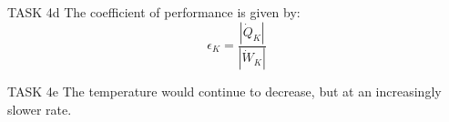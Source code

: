 TASK 4d  
The coefficient of performance is given by:  
\[
\epsilon_K = \frac{|\dot{Q}_K|}{|\dot{W}_K|}
\]

TASK 4e  
The temperature would continue to decrease, but at an increasingly slower rate.